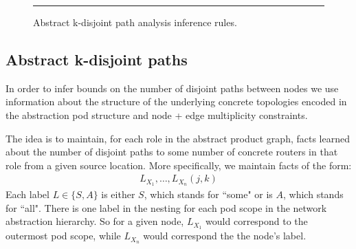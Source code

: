 \documentclass{sig-alternate-10pt}
\begin{document}
\begin{figure}[t!]
  \begin{minipage}[t]{.5\linewidth}%
  \end{minipage}

  \vspace*{1em}
  \begin{minipage}[t]{.5\linewidth}%
  \end{minipage}

  \hrule
  \vspace*{1em}
  \caption{Abstract k-disjoint path analysis inference rules.}
  \label{fig:inference-rules}
\end{figure}


\subsection{Abstract k-disjoint paths}
\label{sec:property-checking}

In order to infer bounds on the number of disjoint paths between nodes we use information about the structure of the underlying concrete topologies encoded in the abstraction pod structure and node + edge multiplicity constraints.

The idea is to maintain, for each role in the abstract product graph, facts learned about the number of disjoint paths to some number of concrete routers in that role from a given source location. More specifically, we maintain facts of the form:
%
\[ \begin{array}{c}
  L_{X_1}, \ldots, L_{X_n}(j,k)
\end{array} \]
\noindent
%
Each label $L \in \{S,A\}$ is either $S$, which stands for ``some" or is $A$, which stands for ``all". There is one label in the nesting for each pod scope in the network abstraction hierarchy. So for a given node, $L_{X_1}$ would correspond to the outermost pod scope, while $L_{X_n}$ would correspond the the node's label.
\end{document}
